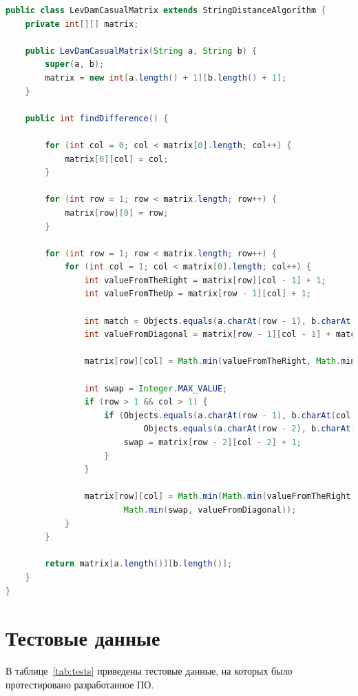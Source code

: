 \documentclass[12pt]{report}
\begin{document}
    \begin{lstlisting}[label=code:levDamCasual,caption=Метод для нахождения расстояния Дамерау-Левенштейна
    итерационно,language=java]
public class LevDamCasualMatrix extends StringDistanceAlgorithm {
    private int[][] matrix;

    public LevDamCasualMatrix(String a, String b) {
        super(a, b);
        matrix = new int[a.length() + 1][b.length() + 1];
    }

    public int findDifference() {

        for (int col = 0; col < matrix[0].length; col++) {
            matrix[0][col] = col;
        }

        for (int row = 1; row < matrix.length; row++) {
            matrix[row][0] = row;
        }

        for (int row = 1; row < matrix.length; row++) {
            for (int col = 1; col < matrix[0].length; col++) {
                int valueFromTheRight = matrix[row][col - 1] + 1;
                int valueFromTheUp = matrix[row - 1][col] + 1;

                int match = Objects.equals(a.charAt(row - 1), b.charAt(col - 1)) ? 0 : 1;
                int valueFromDiagonal = matrix[row - 1][col - 1] + match;

                matrix[row][col] = Math.min(valueFromTheRight, Math.min(valueFromTheUp, valueFromDiagonal));

                int swap = Integer.MAX_VALUE;
                if (row > 1 && col > 1) {
                    if (Objects.equals(a.charAt(row - 1), b.charAt(col - 2)) &&
                            Objects.equals(a.charAt(row - 2), b.charAt(col - 1))) {
                        swap = matrix[row - 2][col - 2] + 1;
                    }
                }

                matrix[row][col] = Math.min(Math.min(valueFromTheRight, valueFromTheUp),
                        Math.min(swap, valueFromDiagonal));
            }
        }

        return matrix[a.length()][b.length()];
    }
}
    \end{lstlisting}


    \section{Тестовые данные}
    В таблице~\ref{tab:tests} приведены тестовые данные, на которых было протестировано разработанное ПО.
\end{document}
